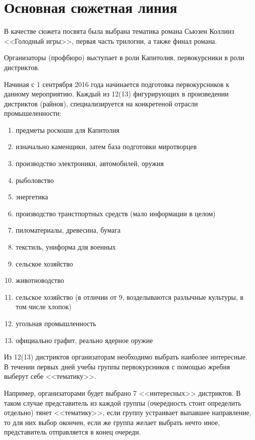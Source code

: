\documentclass[a4paper, 14pt]{extarticle}
\theoremstyle{definition}
\begin{document}
\section{Основная сюжетная линия}

\par В качестве сюжета посвята была выбрана тематика романа Сьюзен Коллинз <<Голодный игры>>, первая часть трилогии, а также финал романа.
\par Организаторы (профбюро) выступает в роли Капитолия, первокурсники в роли дистриктов.
\par Начиная с 1 сентрября 2016 года начинается подготовка первокурсников к данному мероприятию. Каждый из 12(13) фигурирующих в произведении дистриктов (райнов), специализируется на конкретеной отрасли промышеленности:

\begin{enumerate}
\item предметы роскоши для Капитолия
\item изначально каменщики, затем база подготовки миротворцев
\item производство электроники, автомобилей, оружия
\item рыболовство
\item энергетика
\item производство транстпортных средств (мало информации в целом)
\item пиломатериалы, древесина, бумага
\item текстиль, униформа для военных
\item сельское хозяйство
\item животноводство
\item сельское хозяйство (в отличии от 9, возделываются разлычные культуры, в том числе хлопок)
\item угольная промышленность
\item официально графит, реально ядерное оружие
\end{enumerate}

\par Из 12(13) дистриктов организаторам необходимо выбрать наиболее интересные. В течении первых дней учебы группы первокурсников с помощью жребия выберут себе <<тематику>>.

\par Например, организаторами будет выбрано 7 <<интересных>> дистриктов. В таком случае представитель из каждой группы (очередность стоит определить отдельно) тянет <<тематику>>, если группу устраивает выпавшее направление, то для них выбор окончен, если же группа желает выбрать нечто иное, представитель отправляется в конец очереди.
\end{document}
